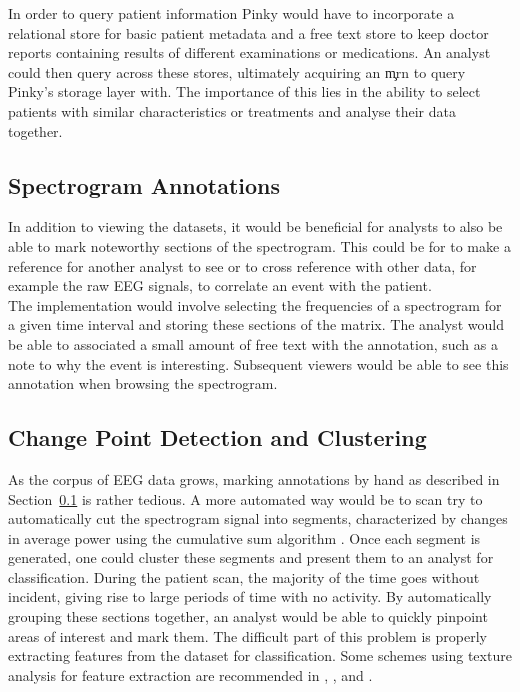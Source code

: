 In order to query patient information Pinky would have to incorporate a
relational store for basic patient metadata and a free text store to keep
doctor reports containing results of different examinations or medications. An
analyst could then query across these stores, ultimately acquiring an \c{mrn}
to query Pinky's storage layer with. The importance of this lies in the ability
to select patients with similar characteristics or treatments and analyse their
data together.

\subsection{Spectrogram Annotations}\label{discuss-ch:annotations}

In addition to viewing the datasets, it would be beneficial for analysts to
also be able to mark noteworthy sections of the spectrogram. This could be for
to make a reference for another analyst to see or to cross reference with other
data, for example the raw EEG signals, to correlate an event with the patient. \\

The implementation would involve selecting the frequencies of a spectrogram for
a given time interval and storing these sections of the matrix.  The analyst
would be able to associated a small amount of free text with the annotation,
such as a note to why the event is interesting. Subsequent viewers would be
able to see this annotation when browsing the spectrogram.

\subsection{Change Point Detection and Clustering}\label{discuss-ch:cpd}

As the corpus of EEG data grows, marking annotations by hand as described in
Section~\ref{discuss-ch:annotations} is rather tedious.  A more automated way
would be to scan try to automatically cut the spectrogram signal into segments,
characterized by changes in average power using the cumulative sum algorithm
\cite{cumsum}. Once each segment is generated, one could cluster these segments
and present them to an analyst for classification. During the patient scan, the
majority of the time goes without incident, giving rise to large periods of
time with no activity. By automatically grouping these sections together, an
analyst would be able to quickly pinpoint areas of interest and mark them. The
difficult part of this problem is properly extracting features from the dataset
for classification. Some schemes using texture analysis for feature extraction
are recommended in \cite{texture-classification1},
\cite{texture-classification2}, and \cite{auto-segment}. \\


